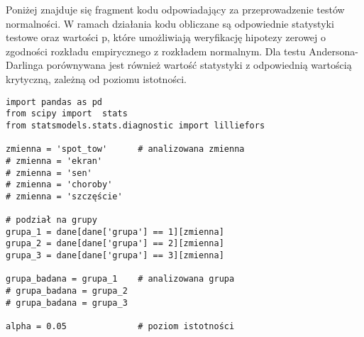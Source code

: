 \documentclass[12pt,a4paper]{article}
\begin{document}
\vspace{2mm}

Poniżej znajduje się fragment kodu odpowiadający za przeprowadzenie testów normalności. W ramach działania kodu obliczane są odpowiednie statystyki testowe oraz wartości p, które umożliwiają weryfikację hipotezy zerowej o zgodności rozkładu empirycznego z rozkładem normalnym. Dla testu Andersona-Darlinga porównywana jest również wartość statystyki z odpowiednią wartością krytyczną, zależną od poziomu istotności.
\begin{lstlisting}
import pandas as pd
from scipy import  stats
from statsmodels.stats.diagnostic import lilliefors

zmienna = 'spot_tow'      # analizowana zmienna
# zmienna = 'ekran'
# zmienna = 'sen'
# zmienna = 'choroby'
# zmienna = 'szczęście'

# podział na grupy
grupa_1 = dane[dane['grupa'] == 1][zmienna]
grupa_2 = dane[dane['grupa'] == 2][zmienna]
grupa_3 = dane[dane['grupa'] == 3][zmienna]

grupa_badana = grupa_1    # analizowana grupa
# grupa_badana = grupa_2
# grupa_badana = grupa_3

alpha = 0.05              # poziom istotności
\end{lstlisting}
\end{document}
